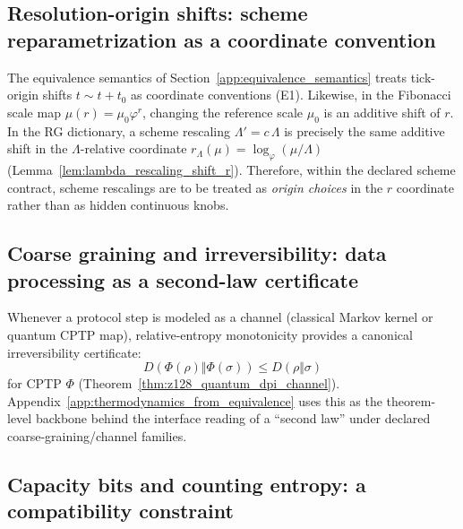 \subsection{Resolution-origin shifts: scheme reparametrization as a coordinate convention}
\label{subsec:rigidity_scheme_shift_as_origin_shift}

\begin{corollary}\label{cor:rigidity_scheme_shift_origin_r}
\AuditTag The equivalence semantics of Section~\ref{app:equivalence_semantics} treats tick-origin shifts $t\sim t+t_0$ as coordinate conventions (E1).
Likewise, in the Fibonacci scale map $\mu(r)=\mu_0\varphi^r$, changing the reference scale $\mu_0$ is an additive shift of $r$.
In the RG dictionary, a scheme rescaling $\Lambda'\!=c\,\Lambda$ is precisely the same additive shift in the $\Lambda$-relative coordinate $r_\Lambda(\mu)=\log_\varphi(\mu/\Lambda)$ (Lemma~\ref{lem:lambda_rescaling_shift_r}).
Therefore, within the declared scheme contract, scheme rescalings are to be treated as \emph{origin choices} in the $r$ coordinate rather than as hidden continuous knobs.
\end{corollary}

\subsection{Coarse graining and irreversibility: data processing as a second-law certificate}
\label{subsec:rigidity_dpi_second_law}

\begin{corollary}\label{cor:rigidity_dpi_irreversibility_certificate}
\AuditTag Whenever a protocol step is modeled as a channel (classical Markov kernel or quantum CPTP map), relative-entropy monotonicity provides a canonical irreversibility certificate:
\[
D(\Phi(\rho)\Vert \Phi(\sigma))\le D(\rho\Vert \sigma)
\]
for CPTP $\Phi$ (Theorem~\ref{thm:z128_quantum_dpi_channel}).
Appendix~\ref{app:thermodynamics_from_equivalence} uses this as the theorem-level backbone behind the interface reading of a ``second law'' under declared coarse-graining/channel families.
\end{corollary}

\subsection{Capacity bits and counting entropy: a compatibility constraint}
\label{subsec:rigidity_capacity_entropy_compatibility}

